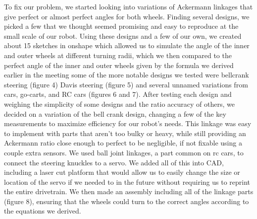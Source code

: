To fix our problem, we started looking into variations of Ackermann linkages that give perfect or almost perfect angles for both wheels. Finding several designs, we picked a few that we thought seemed promising and easy to reproduce at the small scale of our robot. Using these designs and a few of our own, we created about 15 sketches in onshape which allowed us to simulate the angle of the inner and outer wheels at different turning radii, which we then compared to the perfect angle of the inner and outer wheels given by the formula we derived earlier in the meeting some of the more notable designs we tested were bellcrank steering (figure 4) Davis steering (figure 5) and several unnamed variations from cars, go-carts, and RC cars (figures 6 and 7). After testing each design and weighing the simplicity of some designs and the ratio accuracy of others, we decided on a variation of the bell crank design, changing a few of the key measurements to maximize efficiency for our robot’s needs. This linkage was easy to implement with parts that aren’t too bulky or heavy, while still providing an Ackermann ratio close enough to perfect to be negligible, if not fixable using a couple extra sensors. 
We used ball joint linkages, a part common on rc cars, to connect the steering knuckles to a servo. We added all of this into CAD, including a laser cut platform that would allow us to easily change the size or location of the servo if we needed to in the future without requiring us to reprint the entire drivetrain. We then made an assembly including all of the linkage parts (figure 8), ensuring that the wheels could turn to the correct angles according to the equations we derived. 


 

